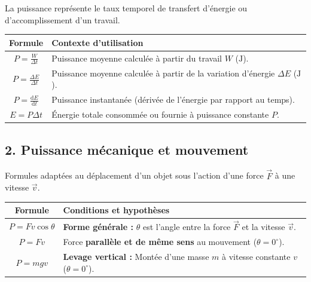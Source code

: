 \documentclass[11pt,openany]{book}
\begin{document}
La puissance représente le taux temporel de transfert d'énergie ou d'accomplissement d'un travail.

\begin{center}
\renewcommand{\arraystretch}{1.8}
\begin{tabular}{|c|l|}
\hline
\textbf{Formule} & \textbf{Contexte d'utilisation} \\ \hline
$\boxed{P = \frac{W}{\Delta t}}$ & Puissance moyenne calculée à partir du travail $W$ ($\mathrm{J}$). \\ \hline
$\boxed{P = \frac{\Delta E}{\Delta t}}$ & Puissance moyenne calculée à partir de la variation d'énergie $\Delta E$ ($\mathrm{J}$). \\ \hline
$\boxed{P = \frac{\mathrm{d}E}{\mathrm{d}t}}$ & Puissance instantanée (dérivée de l'énergie par rapport au temps). \\ \hline
$\boxed{E = P \Delta t}$ & Énergie totale consommée ou fournie à puissance constante $P$. \\ \hline
\end{tabular}
\end{center}

\subsection*{2. Puissance mécanique et mouvement}

Formules adaptées au déplacement d'un objet sous l'action d'une force $\vec{F}$ à une vitesse $\vec{v}$.

\begin{center}
\renewcommand{\arraystretch}{1.8}
\begin{tabular}{|c|l|}
\hline
\textbf{Formule} & \textbf{Conditions et hypothèses} \\ \hline
$\boxed{P = F v \cos\theta}$ & \textbf{Forme générale :} $\theta$ est l'angle entre la force $\vec{F}$ et la vitesse $\vec{v}$. \\ \hline
$\boxed{P = F v}$ & Force \textbf{parallèle et de même sens} au mouvement ($\theta = 0^\circ$). \\ \hline
$\boxed{P = mgv}$ & \textbf{Levage vertical :} Montée d'une masse $m$ à vitesse constante $v$ ($\theta = 0^\circ$). \\ \hline
\end{tabular}
\end{center}

\end{document}
